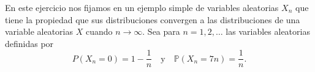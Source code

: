 \question
	En este ejercicio nos fijamos en un ejemplo simple de variables aleatorias $X_n$ que tiene la propiedad que sus distribuciones convergen a las distribuciones de una variable aleatorias $X$ cuando $n\to\infty$. Sea para $n=1,2,\ldots$ las variables aleatorias definidas por
	\begin{equation*}
	P\left(X_n=0\right)=1-\frac{1}{n}\quad\text{y}\quad\mathds{P}\left(X_n=7n\right)=\frac{1}{n}.
	\end{equation*}

	\begin{solutionordottedlines}
		
	\end{solutionordottedlines}